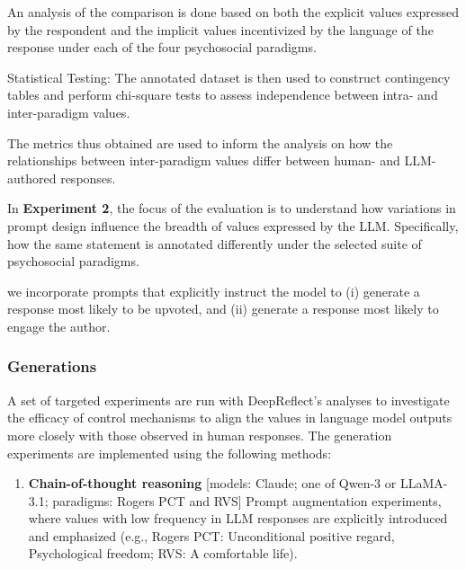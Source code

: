 An analysis of the comparison is done based on both the explicit values expressed by the respondent and the implicit values incentivized by the language of the response under each of the four psychosocial paradigms.

Statistical Testing: The annotated dataset is then used to construct contingency tables and perform chi-square tests to assess independence between intra- and inter-paradigm values.

The metrics thus obtained are used to inform the analysis on how the relationships between inter-paradigm values differ between human- and LLM-authored responses.

In \textbf{Experiment 2}, the focus of the evaluation is to understand how variations in prompt design influence the breadth of values expressed by the LLM. Specifically,
how the same statement is annotated differently under the selected suite of psychosocial paradigms.

we incorporate prompts that explicitly instruct the model to (i) generate a response most likely to be upvoted, and (ii) generate a response most likely to engage the author.


\subsubsection{Generations}
A set of targeted experiments are run with DeepReflect’s analyses to investigate the efficacy of control mechanisms to align the values in language model outputs more closely with those observed in human responses. The generation experiments are implemented using the following methods:

\begin{enumerate}

    \item \textbf{Chain-of-thought reasoning} [models: Claude; one of Qwen-3 or LLaMA-3.1; paradigms: Rogers PCT and RVS]
Prompt augmentation experiments, where values with low frequency in LLM responses are explicitly introduced and emphasized (e.g., Rogers PCT: Unconditional positive regard, Psychological freedom; RVS: A comfortable life).
\end{enumerate}


